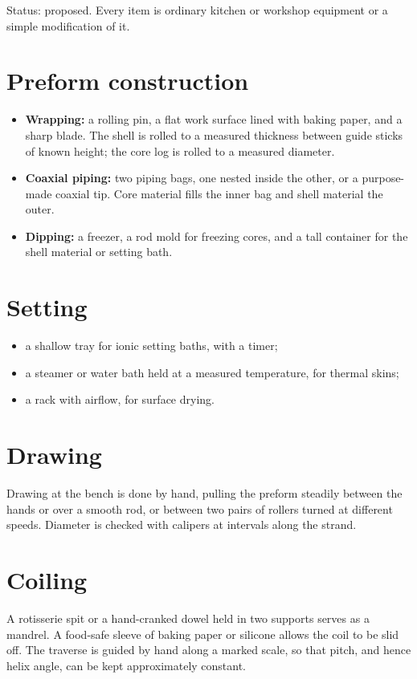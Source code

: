 \documentclass[11pt,openany]{book}
\theoremstyle{definition}
\begin{document}
Status: proposed. Every item is ordinary kitchen or workshop equipment or a simple modification of it.

\section{Preform construction}

\begin{itemize}
\item \textbf{Wrapping:} a rolling pin, a flat work surface lined with baking paper, and a sharp blade. The shell is rolled to a measured thickness between guide sticks of known height; the core log is rolled to a measured diameter.
\item \textbf{Coaxial piping:} two piping bags, one nested inside the other, or a purpose-made coaxial tip. Core material fills the inner bag and shell material the outer.
\item \textbf{Dipping:} a freezer, a rod mold for freezing cores, and a tall container for the shell material or setting bath.
\end{itemize}

\section{Setting}

\begin{itemize}
\item a shallow tray for ionic setting baths, with a timer;
\item a steamer or water bath held at a measured temperature, for thermal skins;
\item a rack with airflow, for surface drying.
\end{itemize}

\section{Drawing}

Drawing at the bench is done by hand, pulling the preform steadily between the hands or over a smooth rod, or between two pairs of rollers turned at different speeds. Diameter is checked with calipers at intervals along the strand.

\section{Coiling}

A rotisserie spit or a hand-cranked dowel held in two supports serves as a mandrel. A food-safe sleeve of baking paper or silicone allows the coil to be slid off. The traverse is guided by hand along a marked scale, so that pitch, and hence helix angle, can be kept approximately constant.
\end{document}
